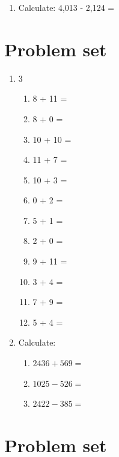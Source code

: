 \documentclass{tufte-book}
\begin{document}
\begin{enumerate}
  \item Calculate: 4,013 - 2,124 = \dotfill\bigskip

\end{enumerate}

\clearpage\section{Problem set }

\begin{enumerate}
  \item
  \begin{multicols}{3}

    \begin{enumerate}\bigskip
      \item 8 + 11 = \dotfill\bigskip
      \item 8 + 0 = \dotfill\bigskip
      \item 10 + 10 = \dotfill\bigskip
      \item 11 + 7 = \dotfill
      \item 10 + 3 = \dotfill\bigskip
      \item 0 + 2 = \dotfill\bigskip
      \item 5 + 1 = \dotfill\bigskip
      \item 2 + 0 = \dotfill
      \item 9 + 11 = \dotfill\bigskip
      \item 3 + 4 = \dotfill\bigskip
      \item 7 + 9 = \dotfill\bigskip
      \item 5 + 4 = \dotfill
    \end{enumerate}
  \end{multicols}

  \item Calculate:
  \begin{enumerate}
    \item $2436 + 569 = $\dotfill\bigskip
    \item $1025 - 526 = $\dotfill\bigskip
    \item $2422 - 385 = $\dotfill\bigskip
  \end{enumerate}
\end{enumerate}

\clearpage\section{Problem set }
\end{document}
